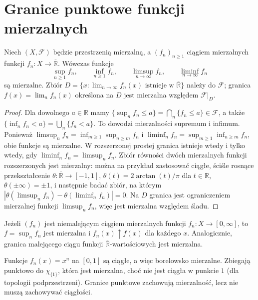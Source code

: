 \section{Granice punktowe funkcji mierzalnych}

\begin{twierdzenie}
\label{thm:pointwise-limits}
Niech $(X,\mathcal F)$ będzie przestrzenią mierzalną,
a $(f_n)_{n\ge1}$ ciągiem mierzalnych funkcji
$f_n:X\to\overline{\mathbb R}$. Wówczas funkcje
\[
\sup_{n\ge1}f_n,\qquad \inf_{n\ge1}f_n,\qquad
\limsup_{n\to\infty}f_n,\qquad
\liminf_{n\to\infty}f_n
\]
są mierzalne. Zbiór
$D=\{x:\lim_{n\to\infty}f_n(x)\text{ istnieje w }
\overline{\mathbb R}\}$ należy do $\mathcal F$;
granica $f(x)=\lim_nf_n(x)$ określona na $D$ jest
mierzalna względem $\mathcal F|_D$.
\end{twierdzenie}
\begin{proof}
Dla dowolnego $a\in\mathbb R$ mamy
$\{\sup_nf_n\le a\}=\bigcap_n\{f_n\le a\}\in\mathcal F$,
a także $\{\inf_nf_n<a\}=\bigcup_n\{f_n<a\}$.
To dowodzi mierzalności supremum i infimum.
Ponieważ
$\limsup_nf_n=\inf_{m\ge1}\sup_{n\ge m}f_n$ i
$\liminf_nf_n=\sup_{m\ge1}\inf_{n\ge m}f_n$,
obie funkcje są mierzalne.
W rozszerzonej prostej granica istnieje wtedy
i tylko wtedy, gdy $\liminf_nf_n=\limsup_nf_n$.
Zbiór równości dwóch mierzalnych funkcji rozszerzonych
jest mierzalny: można na przykład zastosować
ciągłe, ściśle rosnące przekształcenie
$\theta:\overline{\mathbb R}\to[-1,1]$,
$\theta(t)=2\arctan(t)/\pi$ dla $t\in\mathbb R$,
$\theta(\pm\infty)=\pm1$, i następnie badać zbiór,
na którym $|\theta(\limsup_nf_n)-
\theta(\liminf_nf_n)|=0$.
Na $D$ granica jest ograniczeniem mierzalnej funkcji
$\limsup_nf_n$, więc jest mierzalna względem śladu.
\end{proof}

\begin{wniosek}\label{idx:06:wniosek:06}

Jeżeli $(f_n)$ jest niemalejącym ciągiem mierzalnych
funkcji $f_n:X\to[0,\infty]$, to $f=\sup_nf_n$
jest mierzalna i $f_n(x)\uparrow f(x)$ dla każdego $x$.
Analogicznie, granica malejącego ciągu funkcji
$\overline{\mathbb R}$-wartościowych jest mierzalna.
\end{wniosek}

\begin{przyklad}
Funkcje $f_n(x)=x^n$ na $[0,1]$ są ciągłe,
a więc borelowsko mierzalne. Zbiegają punktowo do
$\chi_{\{1\}}$, która jest mierzalna, choć
nie jest ciągła w punkcie $1$ (dla topologii podprzestrzeni).
Granice punktowe zachowują mierzalność, lecz nie muszą
zachowywać ciągłości.
\end{przyklad}

